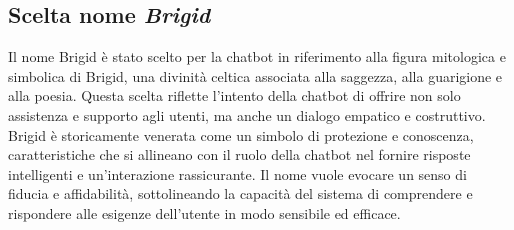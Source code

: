 \documentclass[12pt, letterpaper]{article}
\begin{document}
\subsection{Scelta nome \textit{Brigid}}
Il nome Brigid è stato scelto per la chatbot in riferimento alla figura mitologica e simbolica di Brigid, una divinità celtica associata alla saggezza, alla guarigione e alla poesia. Questa scelta riflette l’intento della chatbot di offrire non solo assistenza e supporto agli utenti, ma anche un dialogo empatico e costruttivo. Brigid è storicamente venerata come un simbolo di protezione e conoscenza, caratteristiche che si allineano con il ruolo della chatbot nel fornire risposte intelligenti e un’interazione rassicurante. Il nome vuole evocare un senso di fiducia e affidabilità, sottolineando la capacità del sistema di comprendere e rispondere alle esigenze dell’utente in modo sensibile ed efficace.
\end{document}
